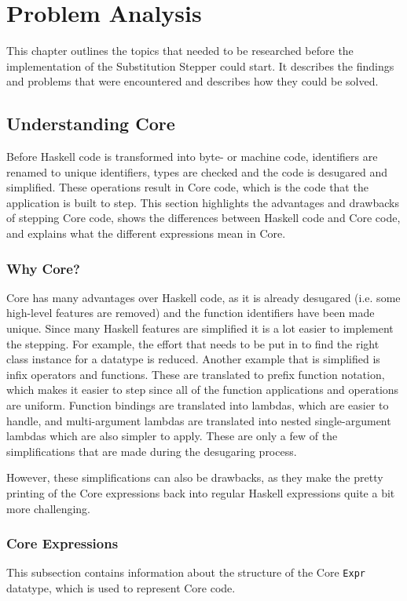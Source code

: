 \chapter{Problem Analysis}
This chapter outlines the topics that needed to be researched before the implementation of the Substitution Stepper could start.
It describes the findings and problems that were encountered and describes how they could be solved.

\section{Understanding Core}
Before Haskell code is transformed into byte- or machine code,
identifiers are renamed to unique identifiers, types are checked and the code is desugared and simplified.
These operations result in Core code, which is the code that the application is built to step.
This section highlights the advantages and drawbacks of stepping Core code,
shows the differences between Haskell code and Core code,
and explains what the different expressions mean in Core.

\subsection{Why Core?}
Core has many advantages over Haskell code,
as it is already desugared (i.e. some high-level features are removed) and the function identifiers have been made unique.
Since many Haskell features are simplified it is a lot easier to implement the stepping.
For example, the effort that needs to be put in to find the right class instance for a datatype is reduced.
Another example that is simplified is infix operators and functions.
These are translated to prefix function notation, which makes it easier to step since all of the function applications and operations are uniform.
Function bindings are translated into lambdas, which are easier to handle,
and multi-argument lambdas are translated into nested single-argument lambdas which are also simpler to apply.
These are only a few of the simplifications that are made during the desugaring process.

However, these simplifications can also be drawbacks,
as they make the pretty printing of the Core expressions back into regular Haskell expressions quite a bit more challenging.

\subsection{Core Expressions}
This subsection contains information about the structure of the Core \texttt{Expr} datatype,
which is used to represent Core code.

